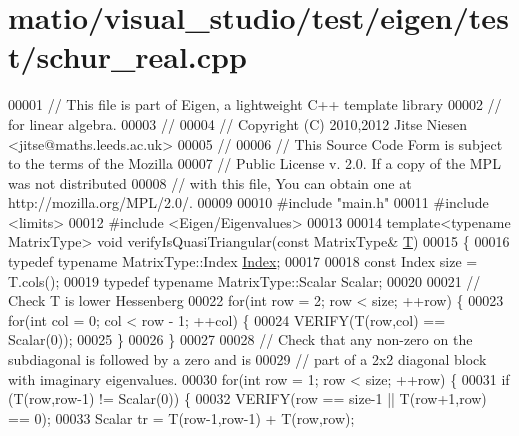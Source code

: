 \hypertarget{matio_2visual__studio_2test_2eigen_2test_2schur__real_8cpp_source}{}\section{matio/visual\+\_\+studio/test/eigen/test/schur\+\_\+real.cpp}
\label{matio_2visual__studio_2test_2eigen_2test_2schur__real_8cpp_source}

\begin{DoxyCode}
00001 \textcolor{comment}{// This file is part of Eigen, a lightweight C++ template library}
00002 \textcolor{comment}{// for linear algebra.}
00003 \textcolor{comment}{//}
00004 \textcolor{comment}{// Copyright (C) 2010,2012 Jitse Niesen <jitse@maths.leeds.ac.uk>}
00005 \textcolor{comment}{//}
00006 \textcolor{comment}{// This Source Code Form is subject to the terms of the Mozilla}
00007 \textcolor{comment}{// Public License v. 2.0. If a copy of the MPL was not distributed}
00008 \textcolor{comment}{// with this file, You can obtain one at http://mozilla.org/MPL/2.0/.}
00009 
00010 \textcolor{preprocessor}{#include "main.h"}
00011 \textcolor{preprocessor}{#include <limits>}
00012 \textcolor{preprocessor}{#include <Eigen/Eigenvalues>}
00013 
00014 \textcolor{keyword}{template}<\textcolor{keyword}{typename} MatrixType> \textcolor{keywordtype}{void} verifyIsQuasiTriangular(\textcolor{keyword}{const} MatrixType& \hyperlink{group___sparse_core___module}{T})
00015 \{
00016   \textcolor{keyword}{typedef} \textcolor{keyword}{typename} MatrixType::Index \hyperlink{namespace_eigen_a62e77e0933482dafde8fe197d9a2cfde}{Index};
00017 
00018   \textcolor{keyword}{const} Index size = T.cols();
00019   \textcolor{keyword}{typedef} \textcolor{keyword}{typename} MatrixType::Scalar Scalar;
00020 
00021   \textcolor{comment}{// Check T is lower Hessenberg}
00022   \textcolor{keywordflow}{for}(\textcolor{keywordtype}{int} row = 2; row < size; ++row) \{
00023     \textcolor{keywordflow}{for}(\textcolor{keywordtype}{int} col = 0; col < row - 1; ++col) \{
00024       VERIFY(T(row,col) == Scalar(0));
00025     \}
00026   \}
00027 
00028   \textcolor{comment}{// Check that any non-zero on the subdiagonal is followed by a zero and is}
00029   \textcolor{comment}{// part of a 2x2 diagonal block with imaginary eigenvalues.}
00030   \textcolor{keywordflow}{for}(\textcolor{keywordtype}{int} row = 1; row < size; ++row) \{
00031     \textcolor{keywordflow}{if} (T(row,row-1) != Scalar(0)) \{
00032       VERIFY(row == size-1 || T(row+1,row) == 0);
00033       Scalar tr = T(row-1,row-1) + T(row,row);

\end{DoxyCode}
